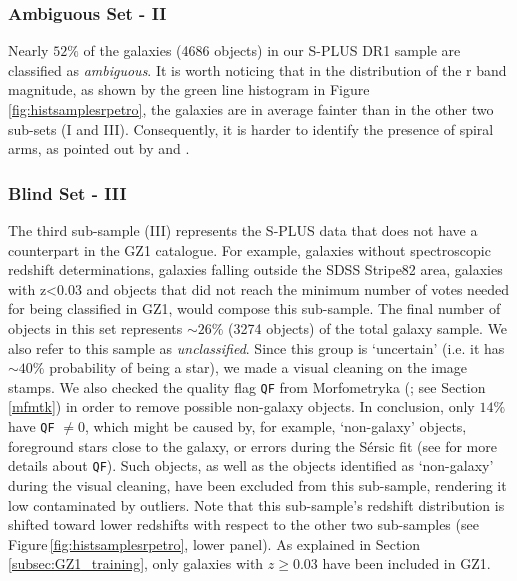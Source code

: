 \documentclass[fleqn,usenatbib]{mnras}
\begin{document}
\subsubsection{Ambiguous Set - II}
Nearly $52\%$ of the galaxies (4686 objects) in our S-PLUS DR1 sample are classified as {\it ambiguous}. It is worth noticing that in the distribution of the r band magnitude, as shown by the green line histogram in Figure \ref{fig:histsamplesrpetro}, the galaxies are in average fainter than in the other two sub-sets (I and III). Consequently, it is harder to identify the presence of spiral arms, as pointed out by \citet{bamford2009galaxy} and \citet{lintott2011}.


\subsubsection{Blind Set - III}
The third sub-sample (III) represents the S-PLUS data that does not have a counterpart in the GZ1 catalogue.
For example, galaxies without spectroscopic redshift determinations, galaxies falling outside the SDSS Stripe82 area, galaxies with z<0.03 and objects that did not reach the minimum number of votes needed for being classified in GZ1, would compose this sub-sample.
The final number of objects in this set represents $\sim 26\%$ (3274 objects) of the total galaxy sample. We also refer to this sample as \textit{unclassified}.
Since this group is `uncertain' (i.e. it has $\sim 40\%$ probability of being a star),  we made a visual cleaning on the image stamps. We also checked the quality flag \texttt{QF} from Morfometryka (\citealp{Ferrari_2015}; see Section\,\ref{mfmtk}) in order to remove possible non-galaxy objects. In conclusion, only $14\%$ have \texttt{QF} $\neq 0$, which might be caused by, for example, `non-galaxy' objects, foreground stars close to the galaxy, or errors during the Sérsic fit (see \cite{Ferrari_2015} for more details about \texttt{QF}). Such objects, as well as the objects identified as `non-galaxy' during the visual cleaning, have been excluded from this sub-sample, rendering it low contaminated by outliers. Note that this sub-sample's redshift distribution is shifted toward lower redshifts with respect to the other two sub-samples (see Figure\,\ref{fig:histsamplesrpetro}, lower panel). As explained in Section\,\ref{subsec:GZ1_training}, only galaxies with $z\geq0.03$ have been included in GZ1.
\end{document}
